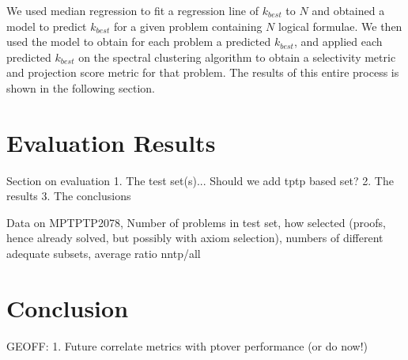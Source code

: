 \documentclass[EPiC]{easychair}
\begin{document}
We used median regression to fit a regression line of $k_{best}$ to $N$ and
obtained a model to predict $k_{best}$ for a given problem containing $N$
logical formulae. We then used the model to obtain for each problem a 
predicted $k_{best}$, and applied each predicted $k_{best}$ on the spectral
clustering algorithm to obtain a selectivity metric and projection score
metric for that problem. The results of this entire process is shown in the 
following section.

\section{Evaluation Results}
\label{Results}

Section on evaluation
1. The test set(s)... Should we add tptp based set?
2. The results
3. The conclusions

Data on MPTPTP2078, Number of problems in test set, how selected (proofs,
hence already solved, but possibly with axiom selection), numbers of
different adequate subsets, average ratio nntp/all

\section{Conclusion}
\label{Conclusion}

GEOFF:
1. Future correlate metrics with ptover performance (or do now!)

\label{sect:bib}


\end{document}
